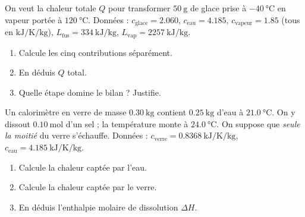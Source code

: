 \documentclass[11pt,a4paper]{article}
\begin{document}
\begin{exo}
On veut la chaleur totale $Q$ pour transformer $\qty{50}{\gram}$ de glace prise à $\qty{-40}{\celsius}$ en vapeur portée à $\qty{120}{\celsius}$. Données : $c_{\text{glace}}=\num{2.060}$, $c_{\text{eau}}=\num{4.185}$, $c_{\text{vapeur}}=\num{1.85}$ (tous en $\si{\kilo\joule\per\kelvin\per\kilogram}$), $L_{\text{fus}}=\qty{334}{\kilo\joule\per\kilogram}$, $L_{\text{vap}}=\qty{2257}{\kilo\joule\per\kilogram}$.
\begin{center}
\end{center}
\begin{enumerate}[label=\alph*)]
  \item Calcule les cinq contributions séparément.
  \item En déduis $Q$ total.
  \item Quelle étape domine le bilan ? Justifie.
\end{enumerate}
\end{exo}

\begin{exo}
Un calorimètre en verre de masse $\qty{0.30}{\kilogram}$ contient $\qty{0.25}{\kilogram}$ d'eau à $\qty{21.0}{\celsius}$. On y dissout $\qty{0.10}{\mol}$ d'un sel ; la température monte à $\qty{24.0}{\celsius}$. On suppose que \emph{seule la moitié} du verre s'échauffe. Données : $c_{\text{verre}}=\qty{0.8368}{\kilo\joule\per\kelvin\per\kilogram}$, $c_{\text{eau}}=\qty{4.185}{\kilo\joule\per\kelvin\per\kilogram}$.
\begin{enumerate}[label=\alph*)]
  \item Calcule la chaleur captée par l'eau.
  \item Calcule la chaleur captée par le verre.
  \item En déduis l'enthalpie molaire de dissolution $\Delta H$.
\end{enumerate}
\end{exo}
\end{document}
